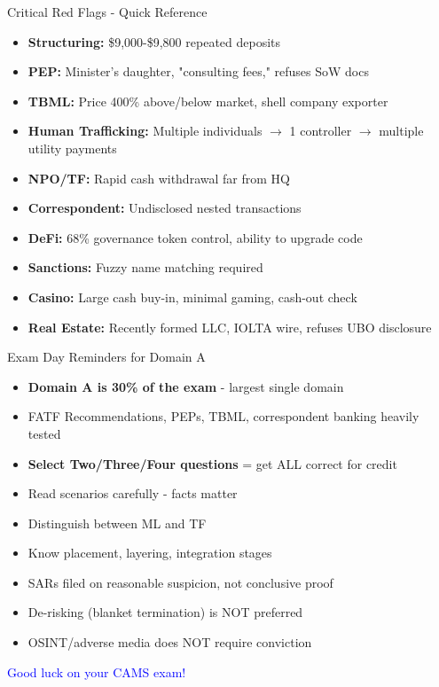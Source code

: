 \documentclass{beamer}
\begin{document}
\begin{frame}{Critical Red Flags - Quick Reference}
	\begin{itemize}
		\item \textbf{Structuring:} \$9,000-\$9,800 repeated deposits
		\item \textbf{PEP:} Minister's daughter, "consulting fees," refuses SoW docs
		\item \textbf{TBML:} Price 400\% above/below market, shell company exporter
		\item \textbf{Human Trafficking:} Multiple individuals $\rightarrow$ 1 controller $\rightarrow$ multiple utility payments
		\item \textbf{NPO/TF:} Rapid cash withdrawal far from HQ
		\item \textbf{Correspondent:} Undisclosed nested transactions
		\item \textbf{DeFi:} 68\% governance token control, ability to upgrade code
		\item \textbf{Sanctions:} Fuzzy name matching required
		\item \textbf{Casino:} Large cash buy-in, minimal gaming, cash-out check
		\item \textbf{Real Estate:} Recently formed LLC, IOLTA wire, refuses UBO disclosure
	\end{itemize}
\end{frame}

\begin{frame}{Exam Day Reminders for Domain A}
	\begin{itemize}
		\item \textbf{Domain A is 30\% of the exam} - largest single domain
		\item FATF Recommendations, PEPs, TBML, correspondent banking heavily tested
		\item \textbf{Select Two/Three/Four questions} = get ALL correct for credit
		\item Read scenarios carefully - facts matter
		\item Distinguish between ML and TF
		\item Know placement, layering, integration stages
		\item SARs filed on reasonable suspicion, not conclusive proof
		\item De-risking (blanket termination) is NOT preferred
		\item OSINT/adverse media does NOT require conviction
	\end{itemize}
	\vspace{0.5cm}
	\centering
	\textcolor{blue}{\Large Good luck on your CAMS exam!}
\end{frame}
\end{document}
